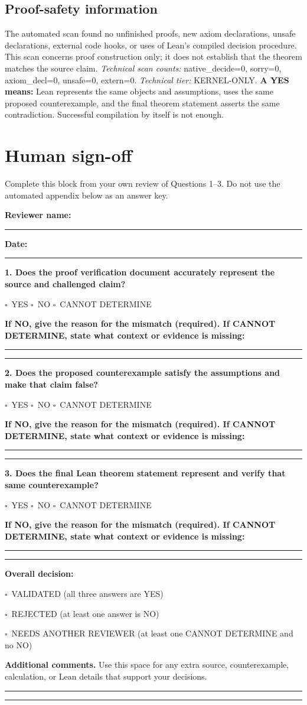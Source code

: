 \documentclass[11pt]{article}
\newcommand{\checkbox}{$\square$}
\newcommand{\answerchoices}{\checkbox\ YES \quad \checkbox\ NO \quad \checkbox\ CANNOT DETERMINE}
\newcommand{\decisionexplanation}{%
  \par\smallskip\textbf{If NO, give the reason for the mismatch (required). If
  CANNOT DETERMINE, state what context or evidence is missing:}\par
  \rule{\linewidth}{0.4pt}\par\vspace{7pt}\rule{\linewidth}{0.4pt}\par}
\begin{document}
\subsection*{Proof-safety information}
The automated scan found no unfinished proofs, new axiom declarations, unsafe declarations, external code hooks, or uses of Lean's compiled decision procedure. This scan concerns proof construction only; it does not establish that the theorem matches the source claim.
\textit{Technical scan counts:} native\_decide=0, sorry=0, axiom\_decl=0, unsafe=0, extern=0. \textit{Technical tier:} KERNEL-ONLY.
\textbf{A YES means:} Lean represents the same objects and assumptions, uses the same proposed counterexample, and the final theorem statement asserts the same contradiction. Successful compilation by itself is not enough.
\clearpage
\section*{Human sign-off}
Complete this block from your own review of Questions 1--3. Do not use the automated appendix below as an answer key.\par
\textbf{Reviewer name:} \rule{9cm}{0.4pt}\par
\textbf{Date:} \rule{4cm}{0.4pt}\par
\medskip\textbf{1. Does the proof verification document accurately represent the source and challenged claim?}\par
\answerchoices\par
\decisionexplanation
\medskip\textbf{2. Does the proposed counterexample satisfy the assumptions and make that claim false?}\par
\answerchoices\par
\decisionexplanation
\medskip\textbf{3. Does the final Lean theorem statement represent and verify that same counterexample?}\par
\answerchoices\par
\decisionexplanation
\medskip\textbf{Overall decision:}\par
\checkbox\ VALIDATED (all three answers are YES)\par
\checkbox\ REJECTED (at least one answer is NO)\par
\checkbox\ NEEDS ANOTHER REVIEWER (at least one CANNOT DETERMINE and no NO)\par
\medskip\textbf{Additional comments.} Use this space for any extra source, counterexample, calculation, or Lean details that support your decisions.\par\rule{\linewidth}{0.4pt}\par\vspace{7pt}\rule{\linewidth}{0.4pt}
\clearpage
\end{document}
